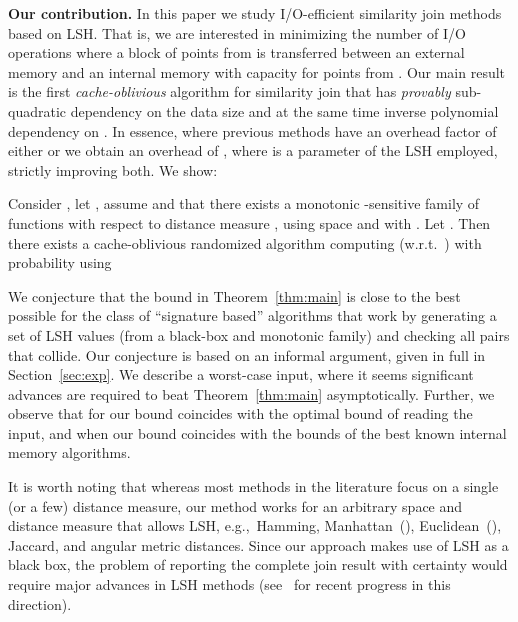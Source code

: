 \documentclass{llncs}
\begin{document}
\textbf{Our contribution.}
In this paper we study I/O-efficient similarity join methods based on LSH.
That is, we are interested in minimizing the number of I/O operations where a block of  points from  is transferred between an external memory and an internal memory with capacity for  points from .
Our main result is the first \emph{cache-oblivious} algorithm for similarity join that has \textit{provably} sub-quadratic dependency on the data size  and at the same time inverse polynomial dependency on .
In essence, where previous methods have an overhead factor of either  or  we obtain an overhead of , where  is a parameter of the LSH employed, strictly improving both. 
We show:
\begin{theorem}\label{thm:main}
Consider , let , assume  and that there exists a monotonic -sensitive family of functions with respect to distance measure , using space  and with . 
Let .
Then there exists a cache-oblivious randomized algorithm computing  (w.r.t.~) with probability  using

\end{theorem}
We  conjecture that the bound in Theorem~\ref{thm:main} 
is close to the best possible for the class of ``signature based''
algorithms that work by generating a set of LSH values 
(from a black-box and monotonic family) and checking all pairs that collide. 
Our conjecture is based on an informal argument, given in full in Section~\ref{sec:exp}. 
We describe a worst-case input, where it seems significant advances are required to beat 
Theorem~\ref{thm:main} asymptotically. Further, we observe that for  our bound coincides with
the optimal bound of reading the input, and when  our bound coincides with the bounds of the best
known internal memory algorithms.

\smallskip

It is worth noting that whereas most methods in the literature focus on a single (or a few) distance measure, our method works for an arbitrary space and distance measure that allows LSH, e.g.,~Hamming, Manhattan~(), Euclidean~(), Jaccard, and angular metric distances. 
Since our approach makes use of LSH as a black box, the problem of reporting the complete join result with certainty would require major advances in LSH methods (see~\cite{Pacuk_COCOON16,Pagh_SODA16} for recent progress in this direction).
\end{document}
